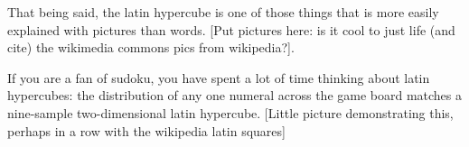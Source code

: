 That being said, the latin hypercube is one of those things that is more easily explained with pictures than words. [Put pictures here: is it cool to just life (and cite) the wikimedia commons pics from wikipedia?].

If you are a fan of sudoku, you have spent a lot of time thinking about latin hypercubes: the distribution of any one numeral across the game board matches a nine-sample two-dimensional latin hypercube. [Little picture demonstrating this, perhaps in a row with the wikipedia latin squares]







